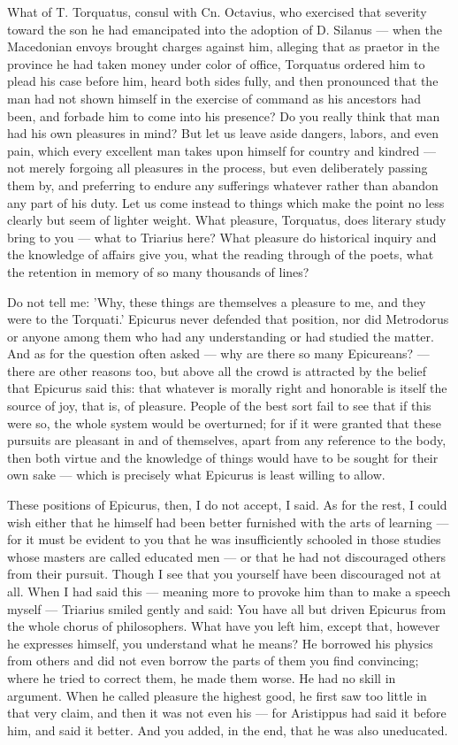  What of T. Torquatus, consul with Cn. Octavius, who exercised that severity toward the son he had emancipated into the adoption of D. Silanus — when the Macedonian envoys brought charges against him, alleging that as praetor in the province he had taken money under color of office, Torquatus ordered him to plead his case before him, heard both sides fully, and then pronounced that the man had not shown himself in the exercise of command as his ancestors had been, and forbade him to come into his presence? Do you really think that man had his own pleasures in mind? But let us leave aside dangers, labors, and even pain, which every excellent man takes upon himself for country and kindred — not merely forgoing all pleasures in the process, but even deliberately passing them by, and preferring to endure any sufferings whatever rather than abandon any part of his duty. Let us come instead to things which make the point no less clearly but seem of lighter weight. What pleasure, Torquatus, does literary study bring to you — what to Triarius here? What pleasure do historical inquiry and the knowledge of affairs give you, what the reading through of the poets, what the retention in memory of so many thousands of lines?

 Do not tell me: 'Why, these things are themselves a pleasure to me, and they were to the Torquati.' Epicurus never defended that position, nor did Metrodorus or anyone among them who had any understanding or had studied the matter. And as for the question often asked — why are there so many Epicureans? — there are other reasons too, but above all the crowd is attracted by the belief that Epicurus said this: that whatever is morally right and honorable is itself the source of joy, that is, of pleasure. People of the best sort fail to see that if this were so, the whole system would be overturned; for if it were granted that these pursuits are pleasant in and of themselves, apart from any reference to the body, then both virtue and the knowledge of things would have to be sought for their own sake — which is precisely what Epicurus is least willing to allow.

 These positions of Epicurus, then, I do not accept, I said. As for the rest, I could wish either that he himself had been better furnished with the arts of learning — for it must be evident to you that he was insufficiently schooled in those studies whose masters are called educated men — or that he had not discouraged others from their pursuit. Though I see that you yourself have been discouraged not at all. When I had said this — meaning more to provoke him than to make a speech myself — Triarius smiled gently and said: You have all but driven Epicurus from the whole chorus of philosophers. What have you left him, except that, however he expresses himself, you understand what he means? He borrowed his physics from others and did not even borrow the parts of them you find convincing; where he tried to correct them, he made them worse. He had no skill in argument. When he called pleasure the highest good, he first saw too little in that very claim, and then it was not even his — for Aristippus had said it before him, and said it better. And you added, in the end, that he was also uneducated.

